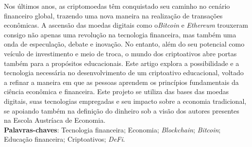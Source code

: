 \par
\begin{resumo}
Nos últimos anos, as criptomoedas têm conquistado seu caminho no cenário financeiro global, trazendo uma nova maneira na realização de transações econômicas. A ascensão das moedas digitais como o\textit{Bitcoin} e \textit{Ethereum} trouxeram consigo não apenas uma revolução na tecnologia financeira, mas também uma onda de especulação, debate e inovação. No entanto, além do seu potencial como veículo de investimento e meio de troca, o mundo dos criptoativos abre portas também para a propósitos educacionais. Este artigo explora a possibilidade e a tecnologia necessária no desenvolvimento de um criptoativo educacional, voltado a refinar a maneira em que as pessoas aprendem os princípios fundamentais da ciência econômica e financeira. Este projeto se utiliza das bases das moedas digitais, suas tecnologias empregadas e seu impacto sobre a economia tradicional, se apoiando também na definição do dinheiro sob a visão dos autores presentes na Escola Austríaca de Economia.
\vspace{\onelineskip} \\
\noindent
\textbf{Palavras-chaves}: Tecnologia financeira; Economia; \textit{Blockchain}; \textit{Bitcoin}; Educação financeira; Criptoativos; \textit{DeFi}.

\end{resumo}
